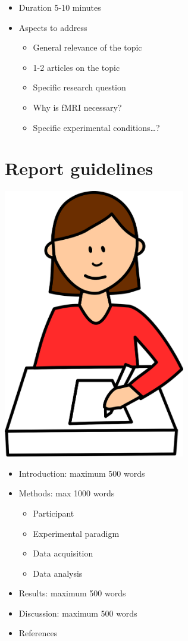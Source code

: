 \documentclass[
  letterpaper,
]{report}
\begin{document}
\begin{itemize}
\item
  Duration 5-10 minutes
\item
  Aspects to address

  \begin{itemize}
  \item
    General relevance of the topic
  \item
    1-2 articles on the topic
  \item
    Specific research question
  \item
    Why is fMRI necessary?
  \item
    Specific experimental conditions\ldots?
  \end{itemize}
\end{itemize}

\section*{Report guidelines}\label{report-guidelines}


\includegraphics[width=3.125in,height=\textheight,keepaspectratio]{images/classroom-1297781_1280.png}

\begin{itemize}
\item
  Introduction: maximum 500 words
\item
  Methods: max 1000 words

  \begin{itemize}
  \item
    Participant
  \item
    Experimental paradigm
  \item
    Data acquisition
  \item
    Data analysis
  \end{itemize}
\item
  Results: maximum 500 words
\item
  Discussion: maximum 500 words
\item
  References
\end{itemize}
\end{document}

